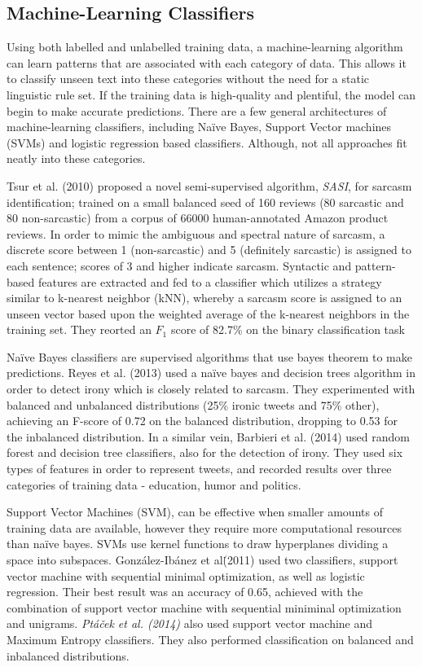 \documentclass[12pt,a4paper]{article}
\begin{document}
\subsection{Machine-Learning Classifiers}
\noindent Using both labelled and unlabelled training data, a machine-learning algorithm can learn patterns that are associated with each category of data. This allows it to classify unseen text into these categories without the need for a static linguistic rule set. If the training data is high-quality and plentiful, the model can begin to make accurate predictions. There are a few general architectures of machine-learning classifiers, including Na\"{i}ve Bayes, Support Vector machines (SVMs) and logistic regression based classifiers. Although, not all approaches fit neatly into these categories.

Tsur et al. (2010) \cite{tsur2010icwsm} proposed a novel semi-supervised algorithm, \textit{SASI}, for sarcasm identification; trained on a small balanced seed of 160 reviews (80 sarcastic and 80 non-sarcastic) from a corpus of 66000 human-annotated Amazon product reviews. In order to mimic the ambiguous and spectral nature of sarcasm, a discrete score between 1 (non-sarcastic) and 5 (definitely sarcastic) is assigned to each sentence; scores of 3 and higher indicate sarcasm. Syntactic and pattern-based features are extracted and fed to a classifier which utilizes a strategy similar to k-nearest neighbor (kNN), whereby a sarcasm score is assigned to an unseen vector based upon the weighted average of the k-nearest neighbors in the training set. They reorted an $F_{1}$ score of 82.7\% on the binary classification task

Na\"{i}ve Bayes classifiers are supervised algorithms that use bayes theorem to make predictions. Reyes et al. (2013) \cite{reyes2013multidimensional} used a na\"{i}ve bayes and decision trees algorithm in order to detect irony which is closely related to sarcasm. They experimented with balanced and unbalanced distributions (25\% ironic tweets and 75\% other), achieving an F-score of 0.72 on the balanced distribution, dropping to 0.53 for the inbalanced distribution. In a similar vein, Barbieri et al. (2014) \cite{barbieri2014modelling} used random forest and decision tree classifiers, also for the detection of irony. They used six types of features in order to represent tweets, and recorded results over three categories of training data - education, humor and politics.

Support Vector Machines (SVM), can be effective when smaller amounts of training data are available, however they require more computational resources than na\"{i}ve bayes. SVMs use kernel functions to draw hyperplanes dividing a space into subspaces. Gonz{\'a}lez-Ib{\'a}nez et al\. (2011) \cite{gonzalez2011identifying} used two classifiers, support vector machine with sequential minimal optimization, as well as logistic regression. Their best result was an accuracy of 0.65, achieved with the combination of support vector machine with sequential miniminal optimization and unigrams. \textit{Pt{\'a}{\v{c}ek et al. (2014)}} \cite{ptavcek2014sarcasm} also used support vector machine and Maximum Entropy classifiers. They also performed classification on balanced and inbalanced distributions.
\end{document}
